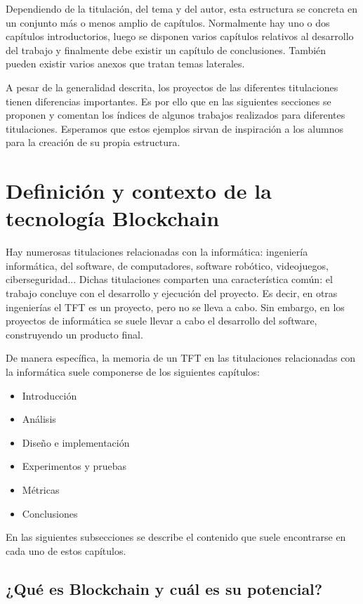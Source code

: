 \documentclass[12pt,spanish,chapterprefix, numbers=noenddot]{book}
\numberwithin{equation}{section}
\numberwithin{figure}{section}
\begin{document}
    Dependiendo de la titulación, del tema y del autor, esta estructura
    se concreta en un conjunto más o menos amplio de capítulos. Normalmente
    hay uno o dos capítulos introductorios, luego se disponen varios capítulos
    relativos al desarrollo del trabajo y finalmente debe existir un capítulo
    de conclusiones. También pueden existir varios anexos que tratan temas
    laterales.

    A pesar de la generalidad descrita, los proyectos de las diferentes
    titulaciones tienen diferencias importantes. Es por ello que en las
    siguientes secciones se proponen y comentan los índices de algunos
    trabajos realizados para diferentes titulaciones. Esperamos que estos
    ejemplos sirvan de inspiración a los alumnos para la creación de su
    propia estructura.

    \section{Definición y contexto de la tecnología Blockchain}

    Hay numerosas titulaciones relacionadas con la informática: ingeniería
    informática, del software, de computadores, software robótico, videojuegos,
    ciberseguridad... Dichas titulaciones comparten una característica
    común: el trabajo concluye con el desarrollo y ejecución del proyecto.
    Es decir, en otras ingenierías el TFT es un proyecto, pero no se lleva
    a cabo. Sin embargo, en los proyectos de informática se suele llevar
    a cabo el desarrollo del software, construyendo un producto final.

    De manera específica, la memoria de un TFT en las titulaciones relacionadas
    con la informática suele componerse de los siguientes capítulos:
    \begin{itemize}
        \item Introducción
        \item Análisis
        \item Diseño e implementación
        \item Experimentos y pruebas
        \item Métricas
        \item Conclusiones
    \end{itemize}
    En las siguientes subsecciones se describe el contenido que suele
    encontrarse en cada uno de estos capítulos.

    \subsection{¿Qué es Blockchain y cuál es su potencial?}
\end{document}
